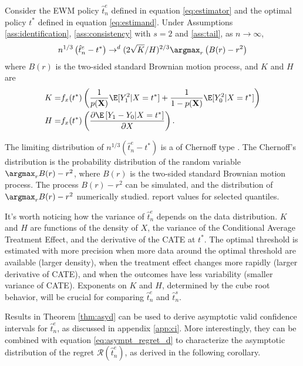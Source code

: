 {\begin{thm} \label{thm:asyd}
Consider the EWM policy $\hat{t}^e_n$ defined in equation \eqref{eq:estimator} and the optimal policy $t^*$ defined in equation \eqref{eq:estimand}. Under Assumptions \ref{ass:identification}, \ref{ass:consistency} with $s=2$ and \ref{ass:tail}, as $n\rightarrow \infty$,
\begin{gather}
    n^{1 / 3}\left(\hat{t}^e_n-t^*\right) \rightarrow^d (2\sqrt{K}/H)^{2/3}\argmax_r \left(B(r) - r^2 \right)
\end{gather}
where $B(r)$ is the two-sided standard Brownian motion process, and $K$ and $H$ are
\begin{align*}
    K
    =& f_x(t^*) \left(\frac{1}{p(\textbf{X})} \E[Y_1^2|X = t^*] + \frac{1}{1-p(\textbf{X})} \E[Y_0^2|X = t^*] \right) \\
    H =&  f_x(t^*) \left(\frac{\partial \E\left[Y_1 - Y_0 | X = t^* \right]}{\partial X} \right).
\end{align*}
\end{thm}

The limiting distribution of $n^{1 / 3}\left(\hat{t}^e_n-t^*\right)$ is a of Chernoff type \citep{chernoff1964estimation}. The Chernoff's distribution is the probability distribution of the random variable $\argmax_r B(r) - r^2$, where $B(r)$ is the two-sided standard Brownian motion process. The process $B(r) - r^2$ can be simulated, and the distribution of $\argmax_r B(r) - r^2$ numerically studied. \cite{groeneboom2001computing} report values for selected quantiles.

It's worth noticing how the variance of $\hat{t}^e_n$ depends on the data distribution. $K$ and $H$ are functions of the density of $X$, the variance of the Conditional Average Treatment Effect, and the derivative of the CATE at $t^*$. The optimal threshold is estimated with more precision when more data around the optimal threshold are available (larger density), when the treatment effect changes more rapidly (larger derivative of CATE), and when the outcomes have less variability (smaller variance of CATE). Exponents on $K$ and $H$, determined by the cube root behavior, will be crucial for comparing $\hat{t}^e_n$ and $\hat{t}^s_n$.

Results in Theorem \ref{thm:asyd} can be used to derive asymptotic valid confidence intervals for $\hat{t}^e_n$, as discussed in appendix \ref{app:ci}. More interestingly, they can be combined with equation \ref{eq:asympt_regret_d} to characterize the asymptotic distribution of the regret $\mathcal{R}(\hat{t}^e_n)$, as derived in the following corollary.

}
